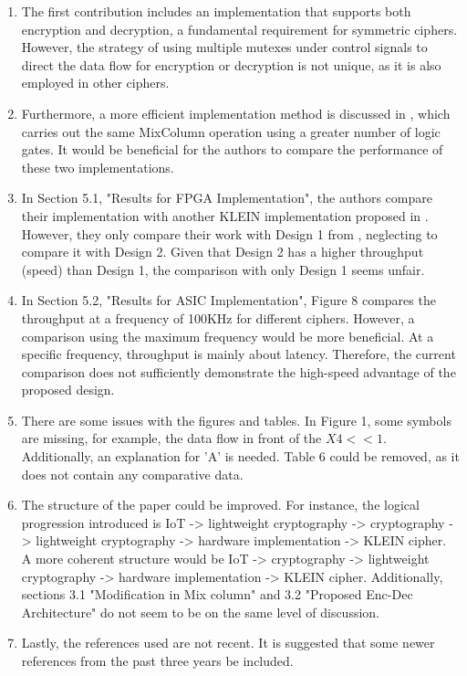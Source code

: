 \documentclass{article}
\begin{document}
\begin{enumerate}
    \item The first contribution includes an implementation that supports both encryption and decryption, a fundamental requirement for symmetric ciphers. However, the strategy of using multiple mutexes under control signals to direct the data flow for encryption or decryption is not unique, as it is also employed in other ciphers.
    \item Furthermore, a more efficient implementation method is discussed in \cite{Shahbazi2021}, which carries out the same MixColumn operation using a greater number of logic gates. It would be beneficial for the authors to compare the performance of these two implementations.
    \item In Section 5.1, "Results for FPGA Implementation", the authors compare their implementation with another KLEIN implementation proposed in \cite{Singh2019}. However, they only compare their work with Design 1 from \cite{Singh2019}, neglecting to compare it with Design 2. Given that Design 2 has a higher throughput (speed) than Design 1, the comparison with only Design 1 seems unfair.
    \item In Section 5.2, "Results for ASIC Implementation", Figure 8 compares the throughput at a frequency of 100KHz for different ciphers. However, a comparison using the maximum frequency would be more beneficial. At a specific frequency, throughput is mainly about latency. Therefore, the current comparison does not sufficiently demonstrate the high-speed advantage of the proposed design.
    \item There are some issues with the figures and tables. In Figure 1, some symbols are missing, for example, the data flow in front of the $X4<<1$. Additionally, an explanation for 'A' is needed. Table 6 could be removed, as it does not contain any comparative data. 
    \item The structure of the paper could be improved. For instance, the logical progression introduced is IoT -> lightweight cryptography -> cryptography -> lightweight cryptography -> hardware implementation -> KLEIN cipher. A more coherent structure would be IoT -> cryptography -> lightweight cryptography -> hardware implementation -> KLEIN cipher. Additionally, sections 3.1 "Modification in Mix column" and 3.2 "Proposed Enc-Dec Architecture" do not seem to be on the same level of discussion.
    \item Lastly, the references used are not recent. It is suggested that some newer references from the past three years be included.
\end{enumerate}


\end{document}
